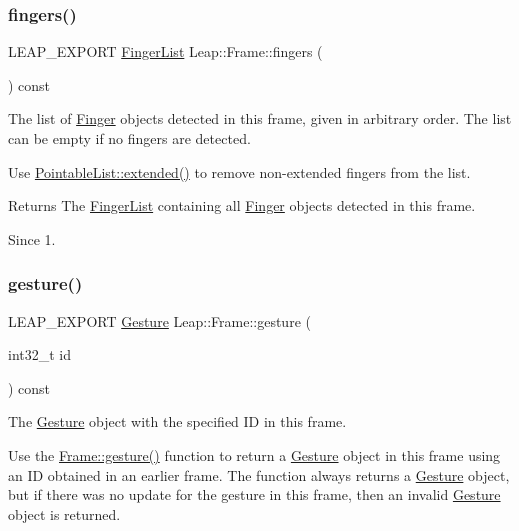 \subsubsection{\texorpdfstring{fingers()}{fingers()}}
{\footnotesize\ttfamily L\+E\+A\+P\+\_\+\+E\+X\+P\+O\+RT \hyperlink{class_leap_1_1_finger_list}{Finger\+List} Leap\+::\+Frame\+::fingers (\begin{DoxyParamCaption}{ }\end{DoxyParamCaption}) const}

The list of \hyperlink{class_leap_1_1_finger}{Finger} objects detected in this frame, given in arbitrary order. The list can be empty if no fingers are detected.

Use \hyperlink{class_leap_1_1_pointable_list_a47919c7b8198806da5af4c7d351d83fc}{Pointable\+List\+::extended()} to remove non-\/extended fingers from the list.


\begin{DoxyCodeInclude}
\end{DoxyCodeInclude}


\begin{DoxyReturn}{Returns}
The \hyperlink{class_leap_1_1_finger_list}{Finger\+List} containing all \hyperlink{class_leap_1_1_finger}{Finger} objects detected in this frame. 
\end{DoxyReturn}
\begin{DoxySince}{Since}
1. 
\end{DoxySince}
\mbox{\label{class_leap_1_1_frame_a107df376205952e9ade4237592494a0e}} 
\subsubsection{\texorpdfstring{gesture()}{gesture()}}
{\footnotesize\ttfamily L\+E\+A\+P\+\_\+\+E\+X\+P\+O\+RT \hyperlink{class_leap_1_1_gesture}{Gesture} Leap\+::\+Frame\+::gesture (\begin{DoxyParamCaption}\item[{int32\+\_\+t}]{id }\end{DoxyParamCaption}) const}

The \hyperlink{class_leap_1_1_gesture}{Gesture} object with the specified ID in this frame.

Use the \hyperlink{class_leap_1_1_frame_a107df376205952e9ade4237592494a0e}{Frame\+::gesture()} function to return a \hyperlink{class_leap_1_1_gesture}{Gesture} object in this frame using an ID obtained in an earlier frame. The function always returns a \hyperlink{class_leap_1_1_gesture}{Gesture} object, but if there was no update for the gesture in this frame, then an invalid \hyperlink{class_leap_1_1_gesture}{Gesture} object is returned.


